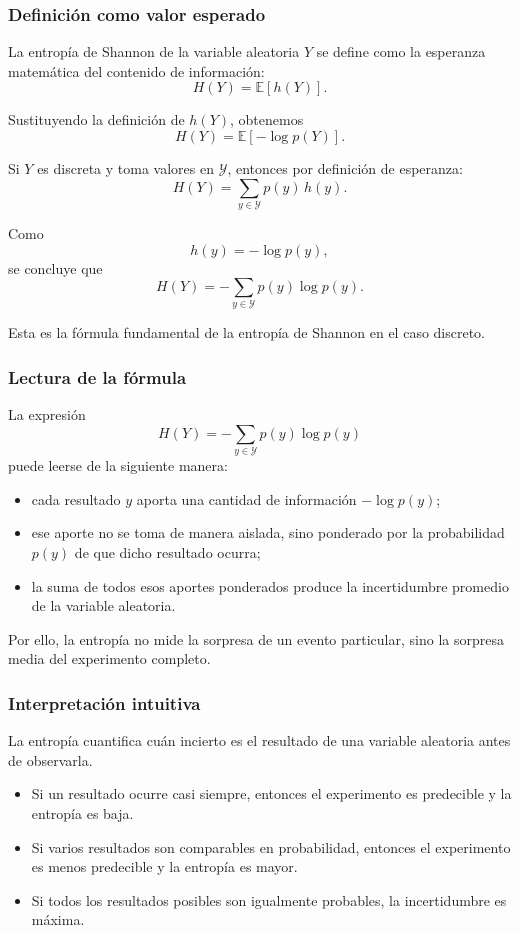 \documentclass{article}
\begin{document}
\subsubsection*{Definición como valor esperado}

La entropía de Shannon de la variable aleatoria \(Y\) se define como la esperanza matemática del contenido de información:
\[
H(Y)=\mathbb{E}[h(Y)].
\]

Sustituyendo la definición de \(h(Y)\), obtenemos
\[
H(Y)=\mathbb{E}[-\log p(Y)].
\]

Si \(Y\) es discreta y toma valores en \(\mathcal{Y}\), entonces por definición de esperanza:
\[
H(Y)=\sum_{y\in\mathcal{Y}} p(y)\,h(y).
\]

Como
\[
h(y)=-\log p(y),
\]
se concluye que
\[
H(Y)= -\sum_{y\in\mathcal{Y}} p(y)\log p(y).
\]

Esta es la fórmula fundamental de la entropía de Shannon en el caso discreto.

\subsubsection*{Lectura de la fórmula}

La expresión
\[
H(Y)= -\sum_{y\in\mathcal{Y}} p(y)\log p(y)
\]
puede leerse de la siguiente manera:

\begin{itemize}
\item cada resultado \(y\) aporta una cantidad de información \( -\log p(y)\);
\item ese aporte no se toma de manera aislada, sino ponderado por la probabilidad \(p(y)\) de que dicho resultado ocurra;
\item la suma de todos esos aportes ponderados produce la incertidumbre promedio de la variable aleatoria.
\end{itemize}

Por ello, la entropía no mide la sorpresa de un evento particular, sino la sorpresa media del experimento completo.

\subsubsection*{Interpretación intuitiva}

La entropía cuantifica cuán incierto es el resultado de una variable aleatoria antes de observarla.

\begin{itemize}
\item Si un resultado ocurre casi siempre, entonces el experimento es predecible y la entropía es baja.
\item Si varios resultados son comparables en probabilidad, entonces el experimento es menos predecible y la entropía es mayor.
\item Si todos los resultados posibles son igualmente probables, la incertidumbre es máxima.
\end{itemize}
\end{document}
